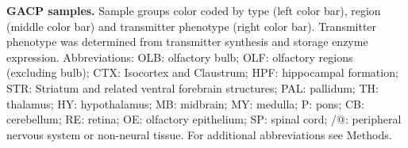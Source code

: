 \textbf{GACP samples.} Sample groups color coded by type (left color bar), region (middle color bar) and transmitter phenotype (right color bar). Transmitter phenotype was determined from transmitter synthesis and storage enzyme expression. Abbreviations: OLB: olfactory bulb; OLF: olfactory regions (excluding bulb); CTX: Isocortex and Claustrum; HPF: hippocampal formation; STR: Striatum and related ventral forebrain structures; PAL: pallidum; TH: thalamus; HY: hypothalamus; MB: midbrain; MY: medulla; P: pons; CB: cerebellum; RE: retina; OE: olfactory epithelium; SP: spinal cord; /@: peripheral nervous system or non-neural tissue. For additional abbreviations see Methods.